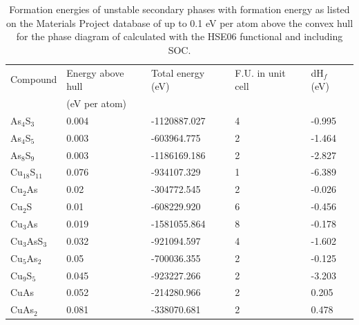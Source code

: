\documentclass[11pt, twoside]{report}
\begin{document}
\begin{table}[]
\begin{tabular}{@{}lllll@{}}
\toprule
Compound & Energy above hull  & Total energy (eV) & F.U. in unit cell & dH$_f$ (eV)   \\ 
         & (eV per atom)      &                   &                   &               \\ \midrule
As$_4$S$_3$    & 0.004                           & -1120887.027      & 4                 & -0.995 \\
As$_4$S$_5$    & 0.003                           & -603964.775       & 2                 & -1.464   \\
As$_8$S$_9$    & 0.003                           & -1186169.186      & 2                 & -2.827  \\
Cu$_{18}$S$_{11}$  & 0.076                           & -934107.329      & 1                 & -6.389 \\
Cu$_2$As    & 0.02                            & -304772.545      & 2                 & -0.026 \\
Cu$_2$S     & 0.01                            & -608229.920      & 6                 & -0.456  \\
Cu$_3$As    & 0.019                           & -1581055.864      & 8                 & -0.178 \\
Cu$_3$AsS$_3$  & 0.032                           & -921094.597      & 4                 & -1.602 \\
Cu$_5$As$_2$   & 0.05                            & -700036.355      & 2                 & -0.125 \\
Cu$_9$S$_5$    & 0.045                           & -923227.266       & 2                 & -3.203 \\
CuAs     & 0.052                           & -214280.966      & 2                 & 0.205  \\
CuAs$_2$    & 0.081                           & -338070.681      & 2                 & 0.478  \\ \bottomrule
\end{tabular}
\caption{Formation energies of unstable secondary phases with formation energy as listed on the Materials Project database of up to 0.1 eV per atom above the convex hull for the phase diagram of {\enargite} calculated with the HSE06 functional and including SOC.}\label{enargite_above_hull}
\end{table}
\end{document}
